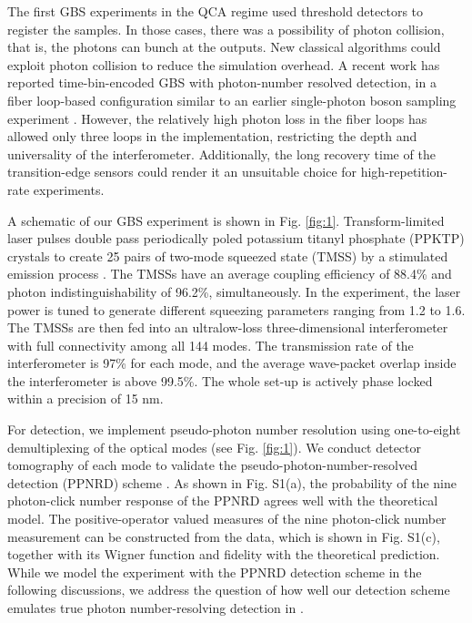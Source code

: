 \documentclass[aps,prl,groupedaddress,superscriptaddress,showpacs,reprint,nofootinbib,nolongbibliography]{revtex4-2}
\begin{document}
The first GBS experiments \cite{Zhong2021, zhongPhaseProgrammableGaussianBoson2021} in the QCA regime used threshold detectors to register the samples. In those cases, there was a possibility of photon collision, that is, the photons can bunch at the outputs. New classical algorithms \cite{bulmerBoundaryQuantumAdvantage2022} could exploit photon collision to reduce the simulation overhead. A recent work \cite{madsenQuantumComputationalAdvantage2022} has reported time-bin-encoded GBS with photon-number resolved detection, in a fiber loop-based configuration similar to an earlier single-photon boson sampling experiment \cite{heTimeBinEncodedBosonSampling2017}. However, the relatively high photon loss in the fiber loops has allowed only three loops in the implementation, restricting the depth and universality of the interferometer. Additionally, the long recovery time of the transition-edge sensors could render it an unsuitable choice for high-repetition-rate experiments.

A schematic of our GBS experiment is shown in Fig. \ref{fig:1}. Transform-limited laser pulses double pass periodically poled potassium titanyl phosphate (PPKTP) crystals to create 25 pairs of two-mode squeezed state (TMSS) by a stimulated emission process \cite{zhongPhaseProgrammableGaussianBoson2021}. The TMSSs have an average coupling efficiency of 88.4\% and photon indistinguishability of 96.2\%, simultaneously. In the experiment, the laser power is tuned to generate different squeezing parameters ranging from 1.2 to 1.6. The TMSSs are then fed into an ultralow-loss three-dimensional interferometer with full connectivity among all 144 modes. The transmission rate of the interferometer is 97\% for each mode, and the average wave-packet overlap inside the interferometer is above 99.5\%. The whole set-up is actively phase locked within a precision of 15 nm.

For detection, we implement pseudo-photon number resolution using one-to-eight demultiplexing of the optical modes (see Fig. \ref{fig:1}).
We conduct detector tomography \cite{lundeenTomographyQuantumDetectors2009} of each mode to validate the pseudo-photon-number-resolved detection (PPNRD) scheme \cite{suppl}. As shown in Fig. S1(a), the probability of the nine photon-click number response of the PPNRD agrees well with the theoretical model. The positive-operator valued measures of the nine photon-click number measurement can be constructed from the data, which is shown in Fig. S1(c), together with its Wigner function and fidelity with the theoretical prediction. While we model the experiment with the PPNRD detection scheme in the following discussions, we address the question of how well our detection scheme emulates true photon number-resolving detection in \cite{suppl}.
\end{document}
